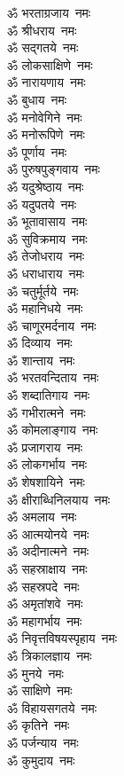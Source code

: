 \begin{multicols}{2}
\begin{flushleft}
ॐ भरताग्रजाय~नमः\\
ॐ श्रीधराय~नमः\\
ॐ सद्गतये~नमः\\
ॐ लोकसाक्षिणे~नमः\\
ॐ नारायणाय~नमः\\
ॐ बुधाय~नमः\\
ॐ मनोवेगिने~नमः\\
ॐ मनोरूपिणे~नमः\\
ॐ पूर्णाय~नमः\hfill{}\\
ॐ पुरुषपुङ्गवाय~नमः\\
ॐ यदुश्रेष्ठाय~नमः\\
ॐ यदुपतये~नमः\\
ॐ भूतावासाय~नमः\\
ॐ सुविक्रमाय~नमः\\
ॐ तेजोधराय~नमः\\
ॐ धराधाराय~नमः\\
ॐ चतुर्मूर्तये~नमः\\
ॐ महानिधये~नमः\\
ॐ चाणूरमर्दनाय~नमः\hfill{}\\
ॐ दिव्याय~नमः\\
ॐ शान्ताय~नमः\\
ॐ भरतवन्दिताय~नमः\\
ॐ शब्दातिगाय~नमः\\
ॐ गभीरात्मने~नमः\\
ॐ कोमलाङ्गाय~नमः\\
ॐ प्रजागराय~नमः\\
ॐ लोकगर्भाय~नमः\\
ॐ शेषशायिने~नमः\\
ॐ क्षीराब्धिनिलयाय~नमः\hfill{}\\
ॐ अमलाय~नमः\\
ॐ आत्मयोनये~नमः\\
ॐ अदीनात्मने~नमः\\
ॐ सहस्राक्षाय~नमः\\
ॐ सहस्रपदे~नमः\\
ॐ अमृतांशवे~नमः\\
ॐ महागर्भाय~नमः\\
ॐ निवृत्तविषयस्पृहाय~नमः\\
ॐ त्रिकालज्ञाय~नमः\\
ॐ मुनये~नमः\hfill{}\\
ॐ साक्षिणे~नमः\\
ॐ विहायसगतये~नमः\\
ॐ कृतिने~नमः\\
ॐ पर्जन्याय~नमः\\
ॐ कुमुदाय~नमः\\

\end{flushleft}
\end{multicols}
